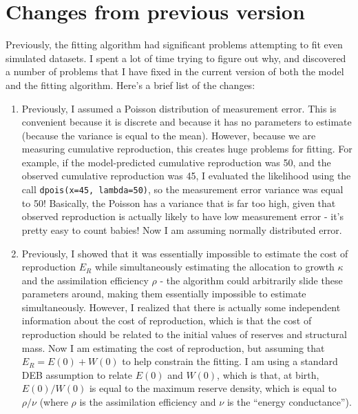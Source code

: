 \documentclass[12pt,reqno,final,pdftex]{amsart}\usepackage[]{graphicx}\usepackage[]{color}
\theoremstyle{plain}
\numberwithin{equation}{part}
\begin{document}
\section*{Changes from previous version}

Previously, the fitting algorithm had significant problems attempting to fit even simulated datasets.
I spent a lot of time trying to figure out why, and discovered a number of problems that I have fixed in the current version of both the model and the fitting algorithm.
Here's a brief list of the changes:
\begin{enumerate}
\item Previously, I assumed a Poisson distribution of measurement error. This is convenient because it is discrete and because it has no parameters to estimate (because the variance is equal to the mean). However, because we are measuring cumulative reproduction, this creates huge problems for fitting. For example, if the model-predicted cumulative reproduction was 50, and the observed cumulative reproduction was 45, I evaluated the likelihood using the call \texttt{dpois(x=45, lambda=50)}, so the measurement error variance was equal to 50! Basically, the Poisson has a variance that is far too high, given that observed reproduction is actually likely to have low measurement error - it's pretty easy to count babies! Now I am assuming normally distributed error.
\item Previously, I showed that it was essentially impossible to estimate the cost of reproduction $E_R$ while simultaneously estimating the allocation to growth $\kappa$ and the assimilation efficiency $\rho$ - the algorithm could arbitrarily slide these parameters around, making them essentially impossible to estimate simultaneously. However, I realized that there is actually some independent information about the cost of reproduction, which is that the cost of reproduction should be related to the initial values of reserves and structural mass. Now I am estimating the cost of reproduction, but assuming that $E_R = E(0) + W(0)$ to help constrain the fitting. I am using a standard DEB assumption to relate $E(0)$ and $W(0)$, which is that, at birth, $E(0)/W(0)$ is equal to the maximum reserve density, which is equal to $\rho/\nu$ (where $\rho$ is the assimilation efficiency and $\nu$ is the ``energy conductance'').
\end{enumerate}
\end{document}
